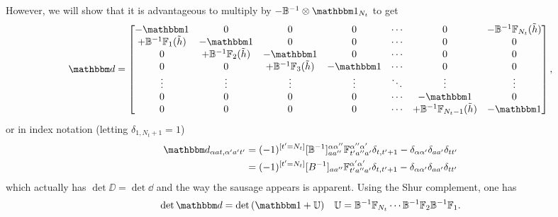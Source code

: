 However, we will show that it is advantageous to multiply by $-\BB\inverse \otimes \one_{N_t}$ to get
\begin{align}
    \dd
	=
	\begin{bmatrix}
			-\one                           & 0                                 & 0                                 & 0         & \cdots & 0                                    & -\BB\inverse\FF_{N_t}(\tilde{h})
		\\	+\BB\inverse\FF_{1}(\tilde{h})  & -\one                             & 0                                 & 0         & \cdots & 0                                    & 0
		\\	0                               & +\BB\inverse\FF_{2}(\tilde{h})    & -\one                             & 0         & \cdots & 0                                    & 0
		\\	0                               & 0                                 & +\BB\inverse\FF_{3}(\tilde{h})    & -\one     & \cdots & 0                                    & 0
		\\	\vdots                          & \vdots                            & \vdots                            & \vdots    & \ddots & \vdots                               & \vdots
		\\	0                               & 0                                 & 0                                 & 0         & \cdots & -\one                                & 0
		\\	0                               & 0                                 & 0                                 & 0         & \cdots & +\BB\inverse\FF_{N_t-1}(\tilde{h})   & -\one
	\end{bmatrix},
	\label{eq:fermion matrix}
\end{align}
or in index notation (letting $\delta_{1,N_t+1}=1$)
\begin{align}
	\dd_{\alpha a t, \alpha' a' t'} &= (-1)^{[t'=N_t]} [\BB\inverse]^{\alpha\alpha''}_{aa''}\FF_{t' a''a'}^{\alpha''\alpha'} \delta_{t,t'+1} - \delta_{\alpha\alpha'} \delta_{aa'} \delta_{tt'}
	\\
	&= (-1)^{[t'=N_t]} [B\inverse]_{aa''}\FF_{t' a''a'}^{\alpha'\alpha'} \delta_{t,t'+1} - \delta_{\alpha\alpha'} \delta_{aa'} \delta_{tt'}
\end{align}
which actually has $\det \DD = \det \dd$ and the way the sausage appears is apparent.
Using the Shur complement, one has
\begin{align}
	\det \dd &= \det\left( \one + \UU \right)
	&
	\UU = \BB\inverse \FF_{N_t} \cdots \BB\inverse \FF_{2} \BB\inverse \FF_1.
	\label{eq:sausage}
\end{align}
